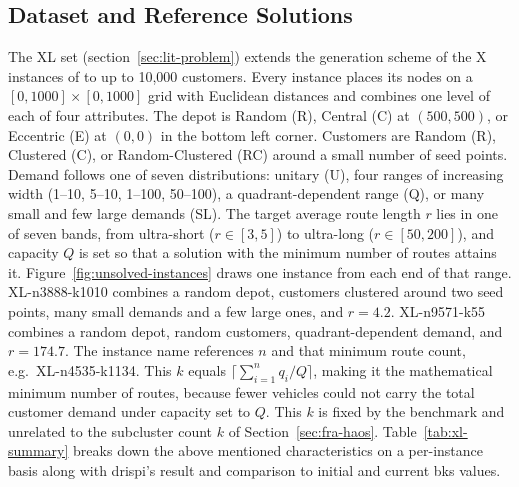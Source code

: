 \subsection{Dataset and Reference Solutions}\label{sec:stu-dataset}
The XL set (section~\ref{sec:lit-problem}) extends the generation scheme of the X
instances of \citet{uchoaNewBenchmarkInstances2017} to up to 10,000 customers. Every instance
places its nodes on a $[0, 1000] \times [0, 1000]$ grid with Euclidean distances
and combines one level of each of four attributes. The depot is Random (R), Central
(C) at $(500, 500)$, or Eccentric (E) at $(0, 0)$ in the bottom left corner. Customers are Random (R), Clustered (C), or
Random-Clustered (RC) around a small number of seed points. Demand follows one of
seven distributions: unitary (U), four ranges of increasing width (1--10, 5--10,
1--100, 50--100), a quadrant-dependent range (Q), or many small and few large
demands (SL). The target average route length $r$ lies in one of seven bands,
from ultra-short ($r \in [3, 5]$) to ultra-long ($r \in [50, 200]$), and
capacity $Q$ is set so that a solution with the minimum number of routes attains
it. Figure~\ref{fig:unsolved-instances} draws one instance from each end of that range. XL-n3888-k1010 combines a random depot, customers clustered around two seed points, many small demands and a few large ones, and $r = 4.2$. XL-n9571-k55 combines a random depot, random customers, quadrant-dependent demand, and $r = 174.7$. The instance name references $n$ and that minimum route count, e.g.\
XL-n4535-k1134. This $k$ equals $\lceil \sum_{i=1}^{n} q_i / Q \rceil$, making it the mathematical minimum number of routes, because fewer vehicles could not carry the total customer demand under capacity set to $Q$. This $k$ is
fixed by the benchmark and unrelated to the subcluster count $k$ of Section~\ref{sec:fra-haos}.
Table~\ref{tab:xl-summary} breaks down the above mentioned characteristics on a per-instance basis along with \gls{drispi}'s result and comparison to initial and current \gls{bks} values.

